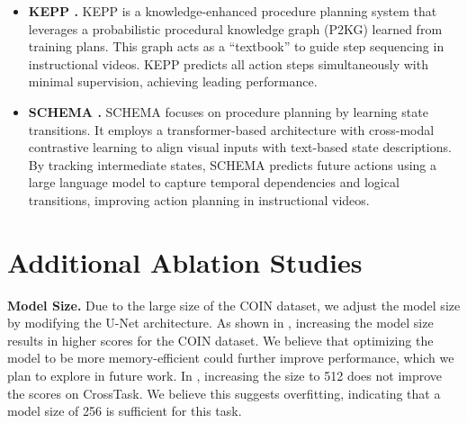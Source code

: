\begin{itemize}
    \item \textbf{KEPP \citep{nagasinghe2024not}.} KEPP is a knowledge-enhanced procedure planning system that leverages a probabilistic procedural knowledge graph (P2KG) learned from training plans. This graph acts as a ``textbook'' to guide step sequencing in instructional videos. KEPP predicts all action steps simultaneously with minimal supervision, achieving leading performance.
    \item \textbf{SCHEMA \citep{niu2024schema}.} SCHEMA focuses on procedure planning by learning state transitions. It employs a transformer-based architecture with cross-modal contrastive learning to align visual inputs with text-based state descriptions. By tracking intermediate states, SCHEMA predicts future actions using a large language model to capture temporal dependencies and logical transitions, improving action planning in instructional videos.
\end{itemize}


\section{Additional Ablation Studies}

\textbf{Model Size.} Due to the large size of the COIN dataset, we adjust the model size by modifying the U-Net architecture. As shown in , increasing the model size results in higher scores for the COIN dataset. We believe that optimizing the model to be more memory-efficient could further improve performance, which we plan to explore in future work. In , increasing the size to 512 does not improve the scores on CrossTask. We believe this suggests overfitting, indicating that a model size of 256 is sufficient for this task.

